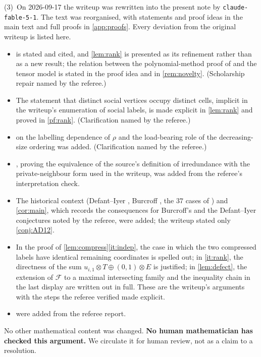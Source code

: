 \documentclass[11pt,a4paper]{article}
\theoremstyle{plain}
\theoremstyle{definition}
\theoremstyle{remark}
\newcommand{\cF}{\mathcal F}
\newcommand{\rk}{\rho}
\begin{document}
(3)~On 2026-09-17 the writeup was rewritten into the present note by \texttt{claude-fable-5-1}. The text was reorganised, with statements and proof ideas in the main text and full proofs in \cref{app:proofs}. Every deviation from the original writeup is listed here.
\begin{itemize}[itemsep=1pt]
\item {} is stated and cited, and \cref{lem:rank} is presented as its refinement rather than as a new result; the relation between the polynomial-method proof of \cite{AD20} and the tensor model is stated in the proof idea and in \cref{rem:novelty}. (Scholarship repair named by the referee.)
\item The statement that distinct social vertices occupy distinct cells, implicit in the writeup's enumeration of social labels, is made explicit in \cref{lem:rank} and proved in \cref{pf:rank}. (Clarification named by the referee.)
\item {} on the labelling dependence of $\rk$ and the load-bearing role of the decreasing-size ordering was added. (Clarification named by the referee.)
\item {}, proving the equivalence of the source's definition of irredundance with the private-neighbour form used in the writeup, was added from the referee's interpretation check.
\item The historical context (Defant--Iyer \cite{DI18}, Burcroff \cite{Bur23}, the $37$ cases of \cite{AD20}) and \cref{cor:main}, which records the consequences for Burcroff's and the Defant--Iyer conjectures noted by the referee, were added; the writeup stated only \cref{conj:AD12}.
\item In the proof of \cref{lem:compress}\ref{it:indep}, the case in which the two compressed labels have identical remaining coordinates is spelled out; in \ref{it:rank}, the directness of the sum $u_{i,1}\otimes T\oplus(0,1)\otimes E$ is justified; in \cref{lem:defect}, the extension of $\cF$ to a maximal intersecting family and the inequality chain in the last display are written out in full. These are the writeup's arguments with the steps the referee verified made explicit.
\item {} were added from the referee report.
\end{itemize}
No other mathematical content was changed. \textbf{No human mathematician has checked this argument.} We circulate it for human review, not as a claim to a resolution.
\end{document}
